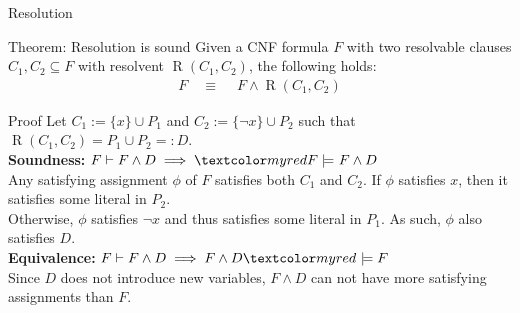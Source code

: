 \documentclass[t]{sdqbeamer}
\begin{document}
\begin{frame}{Resolution}
	\begin{block}{Theorem: Resolution is sound}
		Given a CNF formula $F$ with two resolvable clauses $C_1, C_2 \subseteq F$ with resolvent $\operatorname{R}(C_1,C_2)$, the following holds:
		\vspace*{-1ex}
		\begin{align*}
			{F \quad \equiv~} \quad F \land \operatorname{R}(C_1,C_2)
		\end{align*}
	\end{block}
	
	\pause
	\begin{block}{Proof}
		\pause
		Let $C_1 := \{ x \} \cup P_1$ and $C_2 := \{ \lnot x \} \cup P_2$ such that $\operatorname{R}(C_1,C_2) = P_1 \cup P_2 =: D$.\\[1ex]
		
		\textbf{Soundness:} $F \vdash F \land D \implies \highlo{F \models~} F \land D$ \\[.5ex] \pause
		\pause
		Any satisfying assignment $\phi$ of $F$ satisfies both $C_1$ and $C_2$.
		If $\phi$ satisfies $x$, then it satisfies some literal in $P_2$.\\
		Otherwise, $\phi$ satisfies $\lnot x$ and thus satisfies some literal in $P_1$.
		As such, $\phi$ also satisfies $D$.\\[1ex]
		\pause
		\textbf{Equivalence:} $F \vdash F \land D \implies F \land D \highlo{~\models F}$ \\[.5ex] \pause
		\pause
		Since $D$ does not introduce new variables, $F \wedge D$ can not have more satisfying assignments than $F$.
	\end{block}
\end{frame}
\end{document}
